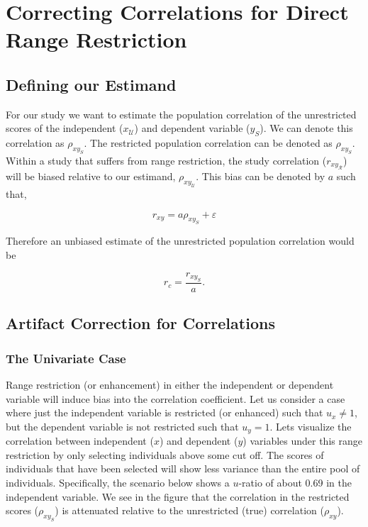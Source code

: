 \documentclass[
  letterpaper,
  DIV=11,
  numbers=noendperiod]{scrreprt}
\begin{document}
\hypertarget{correcting-correlations-for-direct-range-restriction-1}{%
\section{Correcting Correlations for Direct Range
Restriction}\label{correcting-correlations-for-direct-range-restriction-1}}

\hypertarget{defining-our-estimand-3}{%
\subsection{Defining our Estimand}\label{defining-our-estimand-3}}

For our study we want to estimate the population correlation of the
unrestricted scores of the independent (\(x_\mathcal{U}\)) and dependent
variable (\(y_S\)). We can denote this correlation as \(\rho_{xy_S}\).
The restricted population correlation can be denoted as \(\rho_{xy_S}\).
Within a study that suffers from range restriction, the study
correlation (\(r_{xy_{\mathcal{R}}}\)) will be biased relative to our
estimand, \(\rho_{xy_{\mathcal{U}}}\). This bias can be denoted by \(a\)
such that,

\[
r_{xy} = a \rho_{xy_S} + \varepsilon  
\]

Therefore an unbiased estimate of the unrestricted population
correlation would be

\[
r_c = \frac{ r_{xy_S} }{ a}.
\]

\hypertarget{artifact-correction-for-correlations-1}{%
\subsection{Artifact Correction for
Correlations}\label{artifact-correction-for-correlations-1}}

\hypertarget{the-univariate-case-2}{%
\subsubsection*{The Univariate Case}\label{the-univariate-case-2}}

Range restriction (or enhancement) in either the independent or
dependent variable will induce bias into the correlation coefficient.
Let us consider a case where just the independent variable is restricted
(or enhanced) such that \(u_x\neq 1\), but the dependent variable is not
restricted such that \(u_y = 1\). Lets visualize the correlation between
independent (\(x\)) and dependent (\(y\)) variables under this range
restriction by only selecting individuals above some cut off. The scores
of individuals that have been selected will show less variance than the
entire pool of individuals. Specifically, the scenario below shows a
\(u\)-ratio of about 0.69 in the independent variable. We see in the
figure that the correlation in the restricted scores (\(\rho_{xy_S}\))
is attenuated relative to the unrestricted (true) correlation
(\(\rho_{xy}\)).
\end{document}
